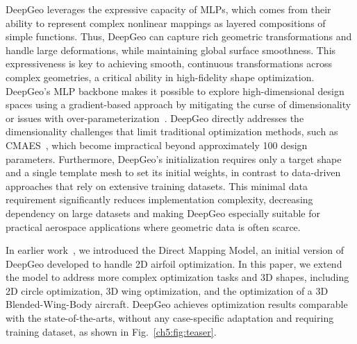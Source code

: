 DeepGeo leverages the expressive capacity of MLPs, which comes from their ability to represent complex nonlinear mappings as layered compositions of simple functions. Thus, DeepGeo can capture rich geometric transformations and handle large deformations, while maintaining global surface smoothness. This expressiveness is key to achieving smooth, continuous transformations across complex geometries, a critical ability in high-fidelity shape optimization. DeepGeo's MLP backbone makes it possible to explore high-dimensional design spaces using a gradient-based approach by mitigating the curse of dimensionality or issues with over-parameterization~\cite{ai.Barron1993,ai.Poggio2017}. DeepGeo directly addresses the dimensionality challenges that limit traditional optimization methods, such as CMAES~\cite{ai.Hansen2016}, which become impractical beyond approximately 100 design parameters. 
Furthermore, DeepGeo’s initialization requires only a target shape and a single template mesh to set its initial weights, in contrast to data-driven approaches that rely on extensive training datasets. This minimal data requirement significantly reduces implementation complexity, decreasing dependency on large datasets and making DeepGeo especially suitable for practical aerospace applications where geometric data is often scarce.

In earlier work~\cite{aa.Wei2023b}, we introduced the Direct Mapping Model, an initial version of DeepGeo developed to handle 2D airfoil optimization. In this paper, we extend the model to address more complex optimization tasks and 3D shapes, including 2D circle optimization, 3D wing optimization, and the optimization of a 3D Blended-Wing-Body aircraft. DeepGeo achieves optimization results comparable with the state-of-the-arts, without any case-specific adaptation and requiring training dataset, as shown in Fig.~\ref{ch5:fig:teaser}.
